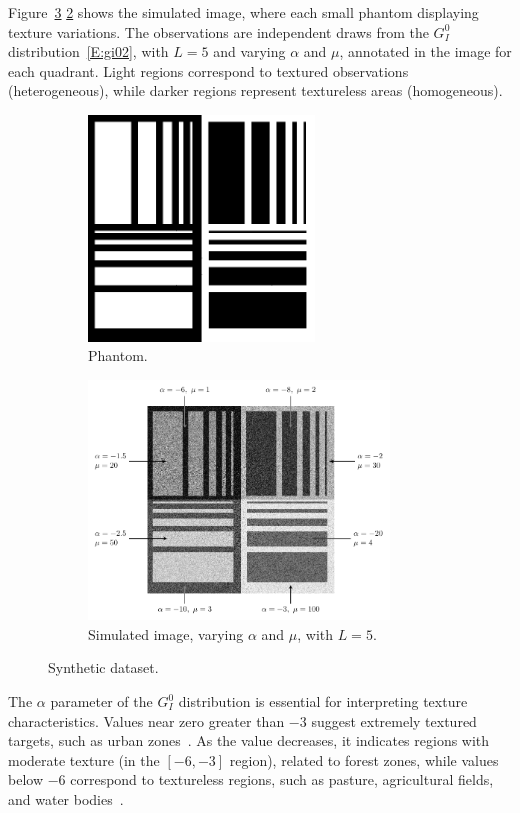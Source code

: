 Figure~\ref{fig:sim_Phantom} \ref{fig:sim_Phantom_2} shows the simulated image, where each
small phantom displaying texture variations. The observations are
independent draws from the \(G^0_I\) distribution~\eqref{E:gi02}, with
\(L = 5\) and varying \(\alpha\) and \(\mu\), annotated in the image for
each quadrant. 
Light regions correspond to textured observations
(heterogeneous), while darker regions represent textureless areas
(homogeneous).
\begin{figure}[H]
  \centering
  \begin{subfigure}[b]{0.38\textwidth}
    \centering
    \includegraphics[width=60mm]{../../Figures/PNG/Phantom1}
    \caption{Phantom.}
    \label{fig:sim_Phantom_1}
  \end{subfigure}
  \hfill
  \begin{subfigure}[b]{0.58\textwidth}
    \centering
    \includegraphics[width=80mm]{../../Figures/PNG/Phantom_label/Phantom_labels}
    \caption{Simulated image, varying $\alpha$ and $\mu$, with $L=5$.}
    \label{fig:sim_Phantom_2}
  \end{subfigure}
  \caption{Synthetic dataset.}
  \label{fig:sim_Phantom}
\end{figure}


The \(\alpha\) parameter of the \(G_I^0\) distribution is essential for
interpreting texture characteristics. Values near zero greater than
\(-3\) suggest extremely textured targets, such as urban
zones~\citep{Frery2019a}. 
As the value decreases, it indicates regions with moderate texture (in the \(\left[-6,-3\right]\) region), related to
forest zones, while values below \(-6\) correspond to textureless
regions, such as pasture, agricultural fields, and water
bodies~\citep{Neto2023}.




